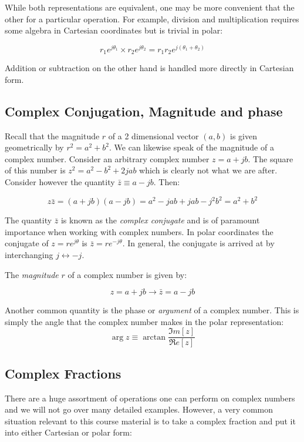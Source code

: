 \documentclass{tufte-book}
\begin{document}
\noindent While both representations are equivalent, one may be more convenient that the other for a particular operation. For example, division and multiplication requires some algebra in Cartesian coordinates but is trivial in polar:

$$
r_1e^{j\theta_1}\times r_2e^{j\theta_2} = r_1r_2e^{j\left(\theta_1+\theta_2\right)}
$$

\noindent Addition or subtraction on the other hand is handled more directly in Cartesian form.

\subsection{Complex Conjugation, Magnitude and phase}
Recall that the magnitude $r$ of a 2 dimensional vector $(a,b)$ is given geometrically by $r^2 = a^2 + b^2$. We can likewise speak of the magnitude of a complex number. Consider an arbitrary complex number $z = a + jb$. The square of this number is $z^2 = a^2 - b^2 +2jab$ which is clearly not what we are after. Consider however the quantity $\bar{z} \equiv a-jb$. Then:

$$
 z\bar{z} = \left(a+jb\right)\left(a-jb\right) = a^2 -jab +jab -j^2b^2 = a^2 + b^2
$$

The quantity $\bar{z}$ is known as the \textit{complex conjugate} and is of paramount importance when working with complex numbers. In polar coordinates the conjugate of $z=re^{j\theta}$ is $\bar z = re^{-j\theta}$. In general, the conjugate is arrived at by interchanging $j\leftrightarrow-j$.

\noindent The \textit{magnitude} $r$ of a complex number is given by:

\begin{equation}\label{def:cpx_mag}
z = a+jb \rightarrow\bar{z} = a -jb
\end{equation}

\noindent Another common quantity is the phase or \textit{argument} of a complex number. This is simply the angle that the complex number makes in the polar representation:
\begin{equation}\label{def:cpx_phs}
\arg z \equiv \arctan{\frac{\Im m [z]}{\Re e [z]}}
\end{equation}

\subsection{Complex Fractions}

There are a huge assortment of operations one can perform on complex numbers and we will not go over many detailed examples. However, a very common situation relevant to this course material is to take a complex fraction and put it into either Cartesian or polar form:
\end{document}
